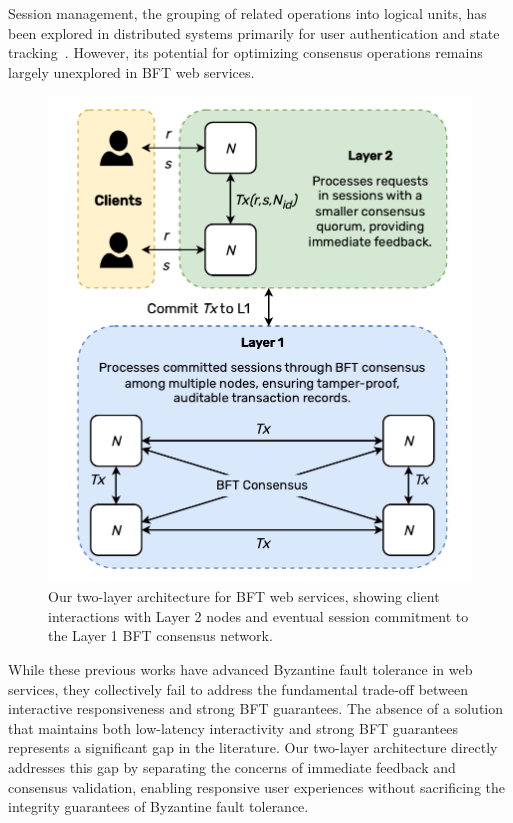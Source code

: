 \documentclass[conference]{IEEEtran}
\begin{document}
Session management, the grouping of related operations into logical units, has been explored in distributed systems primarily for user authentication and state tracking~\cite{calzavara_measuring_2021}. However, its potential for optimizing consensus operations remains largely unexplored in BFT web services.

\begin{figure}[t]
    \centering
    \includegraphics[width=0.85\linewidth]{figure/Thesis Diagrams-V5. Layer 2 System Architecture .drawio.pdf}
    \caption{Our two-layer architecture for BFT web services, showing client interactions with Layer 2 nodes and eventual session commitment to the Layer 1 BFT consensus network.
    }
    \label{fig:system_model}
\end{figure}

While these previous works have advanced Byzantine fault tolerance in web services, they collectively fail to address the fundamental trade-off between interactive responsiveness and strong BFT guarantees. The absence of a solution that maintains both low-latency interactivity and strong BFT guarantees represents a significant gap in the literature. Our two-layer architecture directly addresses this gap by separating the concerns of immediate feedback and consensus validation, enabling responsive user experiences without sacrificing the integrity guarantees of Byzantine fault tolerance.
\end{document}
